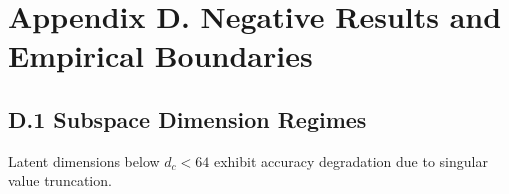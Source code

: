 \section{Appendix D. Negative Results and Empirical Boundaries}
\subsection{D.1 Subspace Dimension Regimes}
Latent dimensions below $d_c < 64$ exhibit accuracy degradation due to singular value truncation.
